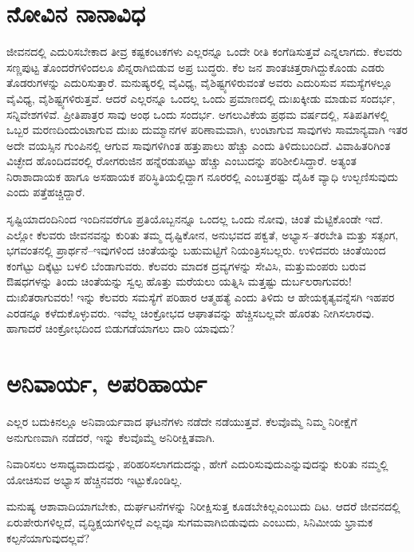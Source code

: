 \section*{ನೋವಿನ ನಾನಾವಿಧ}


ಜೀವನದಲ್ಲಿ ಎದುರಿಸಬೇಕಾದ ತೀವ್ರ ಕಷ್ಟಕಂಟಕಗಳು ಎಲ್ಲರನ್ನೂ ಒಂದೇ ರೀತಿ ಕಂಗೆಡಿಸುತ್ತವೆ ಎನ್ನಲಾಗದು. ಕೆಲವರು ಸಣ್ಣಪುಟ್ಟ ತೊಂದರೆಗಳಿಂದಲೂ ಖಿನ್ನರಾಗಿಬಿಡುವ ಅಪ್ರ ಬುದ್ಧರು. ಕೆಲ ಜನ ಶಾಂತಚಿತ್ತರಾಗಿದ್ದುಕೊಂಡು ಎಡರು ತೊಡರುಗಳನ್ನು ಎದುರಿಸುತ್ತಾರೆ. ಮನುಷ್ಯರಲ್ಲಿ ವೈವಿಧ್ಯ, ವೈಶಿಷ್ಟ್ಯಗಳಿರುವಂತೆ ಅವರು ಎದುರಿಸುವ ಸಮಸ್ಯೆಗಳಲ್ಲೂ ವೈವಿಧ್ಯ, ವೈಶಿಷ್ಟ್ಯಗಳಿರುತ್ತವೆ. ಆದರೆ ಎಲ್ಲರನ್ನೂ ಒಂದಲ್ಲ ಒಂದು ಪ್ರಮಾಣದಲ್ಲಿ ದುಃಖಕ್ಕೀಡು ಮಾಡುವ ಸಂದರ್ಭ, ಸನ್ನಿವೇಶಗಳಿವೆ. ಪ್ರೀತಿಪಾತ್ರರ ಸಾವು ಅಂಥ ಒಂದು ಸಂದರ್ಭ. ಅಗಲುವಿಕೆಯ ಪ್ರಥಮ ವರ್ಷದಲ್ಲಿ, ಸತಿಪತಿಗಳಲ್ಲಿ ಒಬ್ಬರ ಮರಣದಿಂದುಂಟಾಗುವ ದುಃಖ ದುಮ್ಮಾನಗಳ ಪರಿಣಾಮವಾಗಿ, ಉಂಟಾಗುವ ಸಾವುಗಳು ಸಾಮಾನ್ಯವಾಗಿ ಇತರ ಅದೇ ವಯಸ್ಸಿನ ಗುಂಪಿನಲ್ಲಿ ಆಗುವ ಸಾವುಗಳಿಗಿಂತ ಹತ್ತುಪಾಲು ಹೆಚ್ಚು ಎಂದು ತಿಳಿದುಬಂದಿದೆ. ವಿವಾಹಿತರಿಗಿಂತ ವಿಚ್ಛೇದ ಹೊಂದಿದವರಲ್ಲಿ ರೋಗರುಜಿನ ಹನ್ನೆರಡುಪಟ್ಟು ಹೆಚ್ಚು ಎಂಬುದನ್ನು ಪರಿಶೀಲಿಸಿದ್ದಾರೆ. ಅತ್ಯಂತ ನಿರಾಶಾದಾಯಕ ಹಾಗೂ ಅಸಹಾಯಕ ಪರಿಸ್ಥಿತಿಯಲ್ಲಿದ್ದಾಗ ನೂರರಲ್ಲಿ ಎಂಬತ್ತರಷ್ಟು ದೈಹಿಕ ವ್ಯಾಧಿ ಉಲ್ಬಣಿಸುವುದು ಎಂದು ಪತ್ತೆಹಚ್ಚಿದ್ದಾರೆ.

ಸೃಷ್ಟಿಯಾದಂದಿನಿಂದ ಇಂದಿನವರೆಗೂ ಪ್ರತಿಯೊಬ್ಬನನ್ನೂ ಒಂದಲ್ಲ ಒಂದು ನೋವು, ಚಿಂತೆ ಮೆಟ್ಟಿಕೊಂಡೇ ಇದೆ. ಎಲ್ಲೋ ಕೆಲವರು ಜೀವನವನ್ನು ಕುರಿತು ತಮ್ಮ ದೃಷ್ಟಿಕೋನ, ಅನುಭವದ ಪಕ್ವತೆ, ಅಭ್ಯಾಸ–ತರಬೇತಿ ಮತ್ತು ಸತ್ಸಂಗ, ಭಗವಂತನಲ್ಲಿ ಪ್ರಾರ್ಥನೆ–ಇವುಗಳಿಂದ ಚಿಂತೆಯನ್ನು ಬಹುಮಟ್ಟಿಗೆ ನಿಯಂತ್ರಿಸಬಲ್ಲರು. ಉಳಿದವರು ಚಿಂತೆಯಿಂದ ಕಂಗೆಟ್ಟು ದಿಕ್ಕೆಟ್ಟು ಬಳಲಿ ಬೆಂಡಾಗುವರು. ಕೆಲವರು ಮಾದಕ ದ್ರವ್ಯಗಳನ್ನು ಸೇವಿಸಿ, ಮತ್ತುಮಂಪರು ಬರುವ ಔಷಧಗಳನ್ನು ತಿಂದು ಚಿಂತೆಯನ್ನು ಸ್ವಲ್ಪ ಹೊತ್ತು ಮರೆಯಲು ಯತ್ನಿಸಿ ಮತ್ತಷ್ಟು ದುರ್ಬಲರಾಗುವರು! ದುಃಖಿತರಾಗುವರು! ಇನ್ನು ಕೆಲವರು ಸಮಸ್ಯೆಗೆ ಪರಿಹಾರ ಆತ್ಮಹತ್ಯೆ ಎಂದು ತಿಳಿದು ಆ ಹೇಯಕೃತ್ಯವನ್ನೆಸಗಿ ಇಹಪರ ಎರಡನ್ನೂ ಕಳೆದುಕೊಳ್ಳುವರು. ಇವೆಲ್ಲ ಚಿಂಕ್ರೋಭದ ಆಘಾತವನ್ನು ಹೆಚ್ಚಿಸಬಲ್ಲವೇ ಹೊರತು ನೀಗಿಸಲಾರವು. ಹಾಗಾದರೆ ಚಿಂಕ್ರೋಭದಿಂದ ಬಿಡುಗಡೆ\-ಯಾಗಲು ದಾರಿ ಯಾವುದು?


\section*{ಅನಿವಾರ್ಯ, ಅಪರಿಹಾರ್ಯ}


ಎಲ್ಲರ ಬದುಕಿನಲ್ಲೂ ಅನಿವಾರ್ಯವಾದ ಘಟನೆಗಳು ನಡೆದೇ ನಡೆಯುತ್ತವೆ. ಕೆಲವೊಮ್ಮೆ ನಿಮ್ಮ ನಿರೀಕ್ಷೆಗೆ ಅನುಗುಣವಾಗಿ ನಡೆದರೆ, ಇನ್ನು ಕೆಲವೊಮ್ಮೆ ಅನಿರೀಕ್ಷಿತವಾಗಿ.

ನಿವಾರಿಸಲು ಅಸಾಧ್ಯವಾದುದನ್ನು, ಪರಿಹರಿಸಲಾಗದುದನ್ನು, ಹೇಗೆ ಎದುರಿಸುವುದು\break ಎನ್ನುವು\-ದನ್ನು ಕುರಿತು ನಮ್ಮಲ್ಲಿ ಯೋಚಿಸುವ ಅಭ್ಯಾಸ ಹೆಚ್ಚಿನವರು ಇಟ್ಟುಕೊಂಡಿಲ್ಲ.

ಮನುಷ್ಯ ಆಶಾವಾದಿಯಾಗಬೇಕು, ದುರ್ಘಟನೆಗಳನ್ನು ನಿರೀಕ್ಷಿಸುತ್ತ ಕೂಡಬೇಕಿಲ್ಲ\break ಎಂಬುದು ದಿಟ. ಆದರೆ ಜೀವನದಲ್ಲಿ ಏರುಪೇರುಗಳಿಲ್ಲದೆ, ವೃದ್ಧಿಕ್ಷಯಗಳಿಲ್ಲದೆ ಎಲ್ಲವೂ ಸುಗಮವಾಗಿಬಿಡುವುದು ಎಂಬುದು, ಸಿನಿಮೀಯ ಭ್ರಾಮಕ ಕಲ್ಪನೆಯಾಗುವುದಲ್ಲವೆ?


